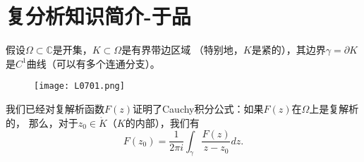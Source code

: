 \section{复分析知识简介-于品}
假设$\Omega\subset \mathbb{C}$是开集，$K\subset \Omega$是有界带边区域
（特别地，$K$是紧的），其边界$\gamma=\partial K$是$C^1$曲线（可以有多个连通分支）。
\begin{figure}[H]
    \centering
    \texttt{[image: L0701.png]}
    \caption{}
\end{figure}

我们已经对复解析函数$F(z)$证明了Cauchy积分公式：如果$F(z)$在$\Omega$上是复解析的，
那么，对于$z_0\in \mathring{K}$（$K$的内部），我们有
\begin{equation*}
F(z_0)=\frac{1}{2\pi i}\int_\gamma \frac{F(z)}{z-z_0}dz.
\end{equation*}



